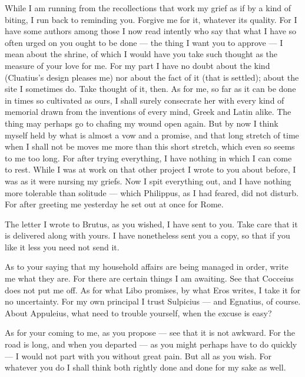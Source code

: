 

 While I am running from the recollections that work my grief as if by a kind of biting, I run back to reminding you. Forgive me for it, whatever its quality. For I have some authors among those I now read intently who say that what I have so often urged on you ought to be done --- the thing I want you to approve --- I mean about the shrine, of which I would have you take such thought as the measure of your love for me. For my part I have no doubt about the kind (Cluatius's design pleases me) nor about the fact of it (that is settled); about the site I sometimes do. Take thought of it, then. As for me, so far as it can be done in times so cultivated as ours, I shall surely consecrate her with every kind of memorial drawn from the inventions of every mind, Greek and Latin alike. The thing may perhaps go to chafing my wound open again. But by now I think myself held by what is almost a vow and a promise, and that long stretch of time when I shall not be moves me more than this short stretch, which even so seems to me too long. For after trying everything, I have nothing in which I can come to rest. While I was at work on that other project I wrote to you about before, I was as it were nursing my griefs. Now I spit everything out, and I have nothing more tolerable than solitude --- which Philippus, as I had feared, did not disturb. For after greeting me yesterday he set out at once for Rome.

 The letter I wrote to Brutus, as you wished, I have sent to you. Take care that it is delivered along with yours. I have nonetheless sent you a copy, so that if you like it less you need not send it.

 As to your saying that my household affairs are being managed in order, write me what they are. For there are certain things I am awaiting. See that Cocceius does not put me off. As for what Libo promises, by what Eros writes, I take it for no uncertainty. For my own principal I trust Sulpicius --- and Egnatius, of course. About Appuleius, what need to trouble yourself, when the excuse is easy?

 As for your coming to me, as you propose --- see that it is not awkward. For the road is long, and when you departed --- as you might perhaps have to do quickly --- I would not part with you without great pain. But all as you wish. For whatever you do I shall think both rightly done and done for my sake as well.
